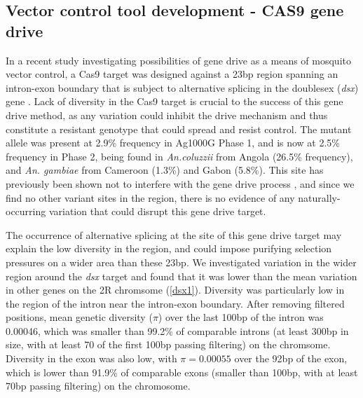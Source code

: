 \documentclass[a4paper,11pt,abstracton,hidelinks]{scrartcl}
\begin{document}
\subsection*{Vector control tool development - CAS9 gene drive}

%
In a recent study investigating possibilities of gene drive as a means of mosquito vector control, a Cas9 target was designed against a 23bp region spanning an intron-exon boundary that is subject to alternative splicing in the doublesex (\textit{dsx}) gene \cite{kyrou2018}.
%
Lack of diversity in the Cas9 target is crucial to the success of this gene drive method, as any variation could inhibit the drive mechanism and thus constitute a resistant genotype that could spread and resist control.
%
The mutant allele was present at 2.9\% frequency in Ag1000G Phase 1, and is now at 2.5\% frequency in Phase 2, being found in \textit{An.coluzzii} from Angola (26.5\% frequency), and \textit{An. gambiae} from Cameroon (1.3\%) and Gabon (5.8\%).
%
This site has previously been shown not to interfere with the gene drive process \cite{kyrou2018}, and since we find no other variant sites in the region, there is no evidence of any naturally-occurring variation that could disrupt this gene drive target. 

The occurrence of alternative splicing at the site of this gene drive target may explain the low diversity in the region, and could impose purifying selection pressures on a wider area than these 23bp.
%
We investigated variation in the wider region around the \textit{dsx} target and found that it was lower than the mean variation in other genes on the 2R chromsome (\ref{dsx1}). 
%
Diversity was particularly low in the region of the intron near the intron-exon boundary.
%
After removing filtered positions, mean genetic diversity ($\pi$) over the last 100bp of the intron was 0.00046, which was smaller than 99.2\% of comparable introns (at least 300bp in size, with at least 70 of the first 100bp passing filtering) on the chromsome.
%
Diversity in the exon was also low, with $\pi = 0.00055$ over the 92bp of the exon, which is lower than 91.9\% of comparable exons (smaller than 100bp, with at least 70bp passing filtering) on the chromosome. 

\end{document}

